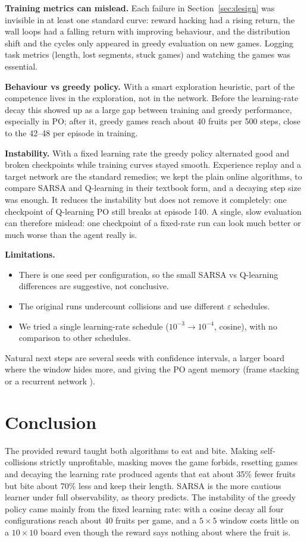 \documentclass{article}
\begin{document}
\textbf{Training metrics can mislead.} Each failure in Section~\ref{sec:design} was invisible in at least one standard curve: reward hacking had a rising return, the wall loops had a falling return with improving behaviour, and the distribution shift and the cycles only appeared in greedy evaluation on new games. Logging task metrics (length, lost segments, stuck games) and watching the games was essential.

\textbf{Behaviour vs greedy policy.} With a smart exploration heuristic, part of the competence lives in the exploration, not in the network. Before the learning-rate decay this showed up as a large gap between training and greedy performance, especially in PO; after it, greedy games reach about 40 fruits per 500 steps, close to the 42--48 per episode in training.

\textbf{Instability.} With a fixed learning rate the greedy policy alternated good and broken checkpoints while training curves stayed smooth. Experience replay and a target network \cite{mnih2015} are the standard remedies; we kept the plain online algorithms, to compare SARSA and Q-learning in their textbook form, and a decaying step size was enough. It reduces the instability but does not remove it completely: one checkpoint of Q-learning PO still breaks at episode 140. A single, slow evaluation can therefore mislead: one checkpoint of a fixed-rate run can look much better or much worse than the agent really is.

\textbf{Limitations.}
\begin{itemize}
\item There is one seed per configuration, so the small SARSA vs Q-learning differences are suggestive, not conclusive.
\item The original runs undercount collisions and use different $\varepsilon$ schedules.
\item We tried a single learning-rate schedule ($10^{-3}\to10^{-4}$, cosine), with no comparison to other schedules.
\end{itemize}
Natural next steps are several seeds with confidence intervals, a larger board where the window hides more, and giving the PO agent memory (frame stacking or a recurrent network \cite{hausknecht2015}).

\section{Conclusion}
\label{sec:conclusion}

The provided reward taught both algorithms to eat and bite. Making self-collisions strictly unprofitable, masking moves the game forbids, resetting games and decaying the learning rate produced agents that eat about 35\% fewer fruits but bite about 70\% less and keep their length.
SARSA is the more cautious learner under full observability, as theory predicts.
The instability of the greedy policy came mainly from the fixed learning rate: with a cosine decay all four configurations reach about 40 fruits per game, and a $5\times5$ window costs little on a $10\times10$ board even though the reward says nothing about where the fruit is.



\end{document}
